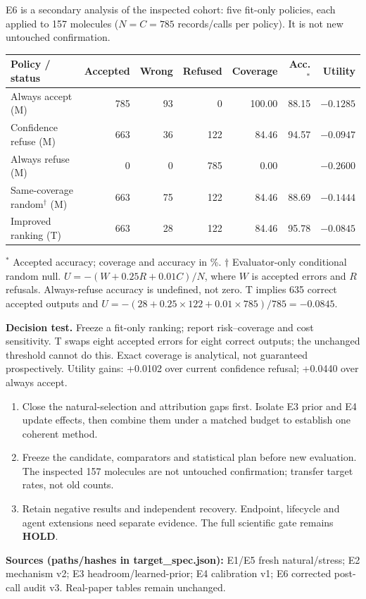 \documentclass[10pt,letterpaper]{article}
\newcommand{\T}[1]{{\color{GuideBlue}#1}}
\newcommand{\NA}{\textemdash}
\newcommand{\note}[1]{{\fontsize{8.5}{10.5}\selectfont #1\par}}
\newcommand{\sectionhead}[1]{\vspace{7pt}{\large\bfseries #1}\par\vspace{3pt}}
\newenvironment{clean}{\begin{center}\fontsize{9.5}{11.5}\selectfont\setlength{\tabcolsep}{8pt}\renewcommand{\arraystretch}{1.10}}{\end{center}}
\begin{document}
\sectionhead{5. Reduce accepted errors without reducing coverage}
E6 is a secondary analysis of the inspected cohort: five fit-only policies, each applied to 157 molecules ($N=C=785$ records/calls per policy). It is not new untouched confirmation.
\par\noindent\begin{minipage}{\linewidth}\end{minipage}\par
\begin{clean}
\setlength{\tabcolsep}{6.5pt}
\begin{tabular}{@{}lrrrrrr@{}}
\toprule
Policy / status & Accepted & Wrong & Refused & Coverage & Acc.$^*$ & Utility \\
\midrule
Always accept (M) & 785 & 93 & 0 & 100.00 & 88.15 & $-0.1285$ \\
Confidence refuse (M) & 663 & 36 & 122 & 84.46 & 94.57 & $-0.0947$ \\
Always refuse (M) & 0 & 0 & 785 & 0.00 & \NA & $-0.2600$ \\
Same-coverage random$^\dagger$ (M) & 663 & 75 & 122 & 84.46 & 88.69 & $-0.1444$ \\
\midrule
\T{Improved ranking (T)} & \T{663} & \T{28} & \T{122} & \T{84.46} & \T{95.78} & \T{$-0.0845$} \\

\bottomrule
\end{tabular}
\end{clean}
\note{$^*$ Accepted accuracy; coverage and accuracy in \%. $\dagger$ Evaluator-only conditional random null. $U=-(W+0.25R+0.01C)/N$, where $W$ is accepted errors and $R$ refusals. Always-refuse accuracy is undefined, not zero. T implies 635 correct accepted outputs and $U=-(28+0.25\times122+0.01\times785)/785=-0.0845$.}
\textbf{Decision test.} Freeze a fit-only ranking; report risk--coverage and cost sensitivity. T swaps eight accepted errors for eight correct outputs; the unchanged threshold cannot do this. Exact coverage is analytical, not guaranteed prospectively. Utility gains: +0.0102 over current confidence refusal; +0.0440 over always accept.

\sectionhead{6. What would turn these goals into evidence?}
\begin{enumerate}\setlength{\itemsep}{1pt}
\item Close the natural-selection and attribution gaps first. Isolate E3 prior and E4 update effects, then combine them under a matched budget to establish one coherent method.
\item Freeze the candidate, comparators and statistical plan before new evaluation. The inspected 157 molecules are not untouched confirmation; transfer target rates, not old counts.
\item Retain negative results and independent recovery. Endpoint, lifecycle and agent extensions need separate evidence. The full scientific gate remains \textbf{HOLD}.
\end{enumerate}
\note{\textbf{Sources (paths/hashes in target\_spec.json):} E1/E5 fresh natural/stress; E2 mechanism v2; E3 headroom/learned-prior; E4 calibration v1; E6 corrected post-call audit v3. Real-paper tables remain unchanged.}
\end{document}
